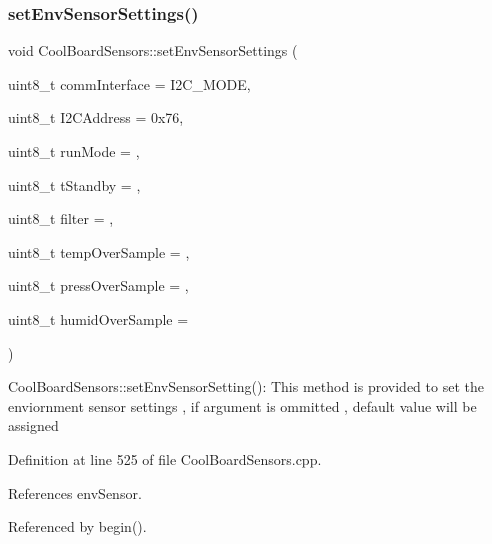 \subsubsection{\texorpdfstring{set\+Env\+Sensor\+Settings()}{setEnvSensorSettings()}}
{\footnotesize\ttfamily void Cool\+Board\+Sensors\+::set\+Env\+Sensor\+Settings (\begin{DoxyParamCaption}\item[{uint8\+\_\+t}]{comm\+Interface = {\ttfamily I2C\+\_\+MODE},  }\item[{uint8\+\_\+t}]{I2\+C\+Address = {\ttfamily 0x76},  }\item[{uint8\+\_\+t}]{run\+Mode = {},  }\item[{uint8\+\_\+t}]{t\+Standby = {},  }\item[{uint8\+\_\+t}]{filter = {},  }\item[{uint8\+\_\+t}]{temp\+Over\+Sample = {},  }\item[{uint8\+\_\+t}]{press\+Over\+Sample = {},  }\item[{uint8\+\_\+t}]{humid\+Over\+Sample = {} }\end{DoxyParamCaption})}

Cool\+Board\+Sensors\+::set\+Env\+Sensor\+Setting()\+: This method is provided to set the enviornment sensor settings , if argument is ommitted , default value will be assigned 

Definition at line 525 of file Cool\+Board\+Sensors.\+cpp.



References env\+Sensor.



Referenced by begin().



